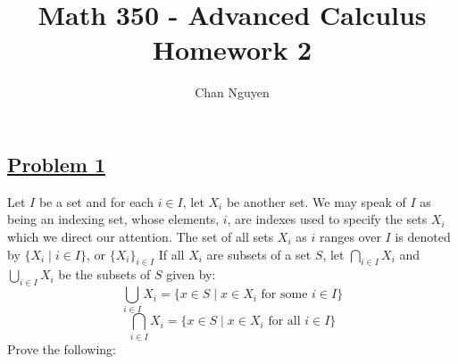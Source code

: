 \documentclass[10pt,letterpaper]{article}
\title{\textbf{Math 350 - Advanced Calculus \\ Homework 2}}
\author{Chan Nguyen}
\begin{document}
\tableofcontents 
\maketitle

\setlength{\parindent}{0pt}
\setlength{\parskip}{1ex}
	\subsection*{{\color{purple}\underline{Problem 1}}}
	Let $I$ be a set and for each $i \in I$, let $X_i$ be another set. We may speak of $I$ as being an
	indexing set, whose elements, $i$, are indexes used to specify the sets $X_i$ which we direct our attention. 
	The set of all sets $X_i$ as $i$ ranges over $I$ is denoted by $\{X_i \mid i \in I\}$, or $\{X_i\}_{i \in I}$
	If all $X_i$ are subsets of a set $S$, let $\displaystyle{\bigcap_{i \in I}}X_i$ and $\displaystyle{\bigcup_{i \in I}X_i}$ be the subsets of $S$
	given by:
	$$\displaystyle{\bigcup_{i \in I}X_i} = \{x \in S \mid x \in X_i \text{ for some } i \in I\}$$
	$$\displaystyle{\bigcap_{i \in I}X_i} = \{x \in S \mid x \in X_i \text{ for all } i \in I\}$$ 	
	Prove the following:
\end{document}
